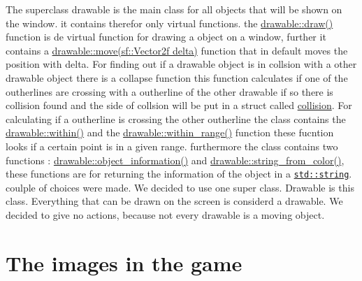 The superclass drawable is the main class for all objects that will be shown on the window. it contains therefor only virtual functions. the \hyperlink{classdrawable_a4e49e2c1121704c83ce24c5f48dd910f}{drawable\+::draw()} function is de virtual function for drawing a object on a window, further it contains a \hyperlink{classdrawable_ad0d3930c045cc6776aa2c3965be32491}{drawable\+::move(sf\+::\+Vector2f delta)} function that in default moves the position with delta. For finding out if a drawable object is in collsion with a other drawable object there is a collapse function this function calculates if one of the outherlines are crossing with a outherline of the other drawable if so there is collision found and the side of collsion will be put in a struct called \hyperlink{structcollision}{collision}. For calculating if a outherline is crossing the other outherline the class contains the \hyperlink{classdrawable_a0d3278e4e888fc8289468e8893dd8329}{drawable\+::within()} and the \hyperlink{classdrawable_ab5c0e1af885f214bc9ef0da47cdb5ac9}{drawable\+::within\+\_\+range()} function these fucntion looks if a certain point is in a given range. furthermore the class contains two functions \+: \hyperlink{classdrawable_a2ed0f8bb53f33477f7722efa7bb24583}{drawable\+::object\+\_\+information()} and \hyperlink{classdrawable_add3d8569fe2616ae0ed503b19c92c08e}{drawable\+::string\+\_\+from\+\_\+color()}, these functions are for returning the information of the object in a \href{http://www.cplusplus.com/reference/string/string/string/}{\tt std\+::string}. coulple of choices were made. We decided to use one super class. Drawable is this class. Everything that can be drawn on the screen is considerd a drawable. We decided to give no actions, because not every drawable is a moving object.\hypertarget{index_images}{}\section{The images in the game}\label{index_images}

